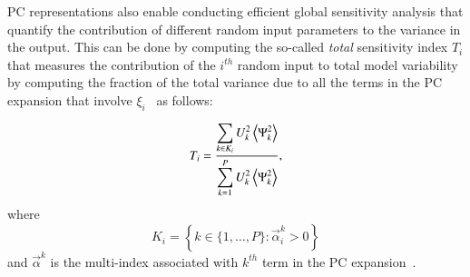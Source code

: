 PC representations also enable conducting
efficient global sensitivity analysis that quantify the
contribution of different random input parameters to the variance in the output.
This can be done by computing the so-called {\it total} 
sensitivity index $T_i$ that measures the contribution of
the $i^{th}$ random input to total model variability by
computing the fraction of the total variance due to all the terms in the
PC expansion that involve $\xi_i$~\citep{LeMaitreKnio2010,Crestaux,Sudret}
as follows:

%

\begin{equation} \label{eq:T-hard}
   T_i =
         \frac{\displaystyle
               \sum_{k \in K_i} U_k^2 \left\langle {\Psi_k^2} \right\rangle}
              {\displaystyle\sum_{k = 1}^P U_k^2 \left\langle {\Psi_k^2} \right\rangle},
\end{equation}
where \[
   K_i = \left\{ k \in \{1, \ldots, P\} :
           \vec{\alpha}^k_i > 0 \right\}
        \]
        and $\vec{\alpha}^k$ is the multi-index associated with $k^{th}$ term in the
PC expansion~\cite{LeMaitreKnio2010}.



